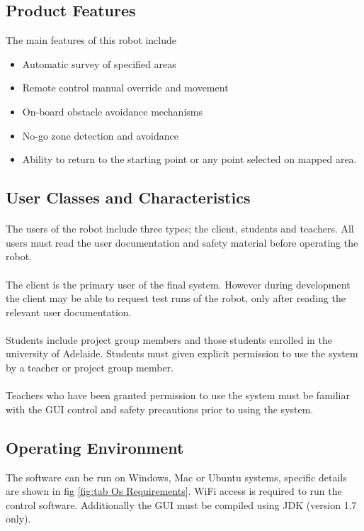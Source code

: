 \documentclass[10pt,a4paper,titlepage]{article}
\begin{document}
	\subsection{Product Features}
	The main features of this robot include
	\begin{itemize}
		\item Automatic survey of specified areas
		\item Remote control manual override and movement
		\item On-board obstacle avoidance mechanisms 
		\item No-go zone detection and avoidance
		\item Ability to return to the starting point or any point selected on mapped area.
	\end{itemize}
	
	\subsection{User Classes and Characteristics}
	\paragraph{}
	The users of the robot include three types; the client, students and teachers. All users must read the user documentation and safety material before operating the robot.
	\paragraph{}
	The client is the primary user of the final system. However during development the client may be able to request test runs of the robot, only after reading the relevant user documentation.
	\paragraph{} 
	Students include project group members and those students enrolled in the university of Adelaide. Students must given explicit permission to use the system by a teacher or project group member.
	\paragraph{}
	Teachers who have been granted permission to use the system must be familiar with the GUI control and safety precautions prior to using the system. 
	
	\subsection{Operating Environment}
	The software can be run on Windows, Mac or Ubuntu systems, specific details are shown in fig \ref{fig:tab Os Requirements}. WiFi access is required to run the control software. Additionally the GUI must be compiled using JDK (version 1.7 only).
	
\end{document}
